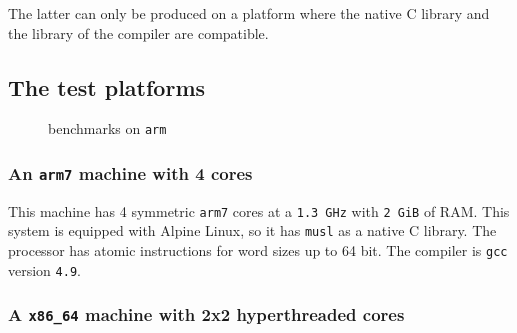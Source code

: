 The latter can only be produced on a platform where the native C
library and the library of the compiler are compatible.

\subsection{The test platforms}
\label{sec-4-3}
\fi
\begin{figure}[t]
  \caption{benchmarks on \texttt{arm}}
  \label{fig:arm}
\end{figure}
\iflong%
\subsubsection{An \texttt{arm7} machine with 4 cores}
\label{sec-4-3-1}

This machine has 4 symmetric \texttt{arm7} cores at a \texttt{1.3 GHz} with \texttt{2
    GiB} of RAM. This system is equipped with Alpine Linux, so it has
\texttt{musl} as a native C library. The processor has atomic
instructions for word sizes up to 64 bit. The compiler is \texttt{gcc}
version \texttt{4.9}.

\subsubsection{A \texttt{x86\_64} machine with 2x2 hyperthreaded cores}
\label{sec-4-3-2}

